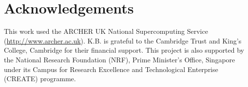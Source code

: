 \section*{Acknowledgements}
This work used the ARCHER UK National Supercomputing Service (\url{http://www.archer.ac.uk}).
K.B. is grateful to the Cambridge Trust and King's College, Cambridge for their financial support.
This project is also supported by the National Research Foundation (NRF), Prime Minister's Office, Singapore under its Campus for Research Excellence and Technological Enterprise (CREATE) programme.
